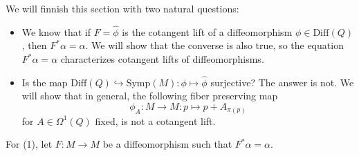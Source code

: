 We will finnish this section with two natural questions: 
\begin{dang}
    \begin{itemize}
    \item[(1)] We know that if $F=\hat{\phi}$ is the cotangent lift of a diffeomorphism $\phi\in\text{Diff}(Q)$, then 
    $F^*\alpha=\alpha$. We will show that the converse is also true, so the equation $F^*\alpha=\alpha$  
    characterizes cotangent lifts of diffeomorphisms.
    \item[(2)] Is the map $ \text{Diff}(Q)\hookrightarrow \text{Symp}(M):\phi\mapsto \hat{\phi}$ surjective? The answer 
    is not. We will show that in general, the following fiber preserving map 
    \begin{equation}
        \phi_A:M\to M: p\mapsto p+A_{\pi(p)}
    \end{equation}
    for $A\in\Omega^1(Q)$ fixed, is not a cotangent lift.
\end{itemize}
\end{dang}
For (1), let $F:M\to M$ be a diffeomorphism such that $F^*\alpha=\alpha$. 
